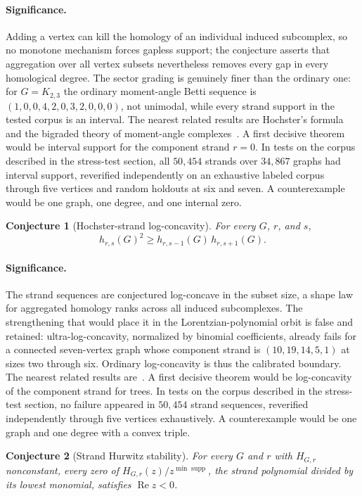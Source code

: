 \documentclass[11pt]{article}
\newtheorem{conjecture}{Conjecture}
\theoremstyle{definition}
\begin{document}
\paragraph{Significance.}
Adding a vertex can kill the homology of an individual induced subcomplex, so no monotone mechanism forces gapless support; the conjecture asserts that aggregation over all vertex subsets nevertheless removes every gap in every homological degree.  The sector grading is genuinely finer than the ordinary one: for $G=K_{2,3}$ the ordinary moment-angle Betti sequence is $(1,0,0,4,2,0,3,2,0,0,0)$, not unimodal, while every strand support in the tested corpus is an interval.  The nearest related results are Hochster's formula and the bigraded theory of moment-angle complexes~\cite{Hoch77,BP15}.  A first decisive theorem would be interval support for the component strand $r=0$.  In tests on the corpus described in the stress-test section, all $50{,}454$ strands over $34{,}867$ graphs had interval support, reverified independently on an exhaustive labeled corpus through five vertices and random holdouts at six and seven.  A counterexample would be one graph, one degree, and one internal zero.

\begin{conjecture}[Hochster-strand log-concavity]\label{x12}
For every $G$, $r$, and $s$,
\[
h_{r,s}(G)^2\ge h_{r,s-1}(G)\,h_{r,s+1}(G).
\]
\end{conjecture}

\paragraph{Significance.}
The strand sequences are conjectured log-concave in the subset size, a shape law for aggregated homology ranks across all induced subcomplexes.  The strengthening that would place it in the Lorentzian-polynomial orbit is false and retained: ultra-log-concavity, normalized by binomial coefficients, already fails for a connected seven-vertex graph whose component strand is $(10,19,14,5,1)$ at sizes two through six.  Ordinary log-concavity is thus the calibrated boundary.  The nearest related results are~\cite{Hoch77,BP15}.  A first decisive theorem would be log-concavity of the component strand for trees.  In tests on the corpus described in the stress-test section, no failure appeared in $50{,}454$ strand sequences, reverified independently through five vertices exhaustively.  A counterexample would be one graph and one degree with a convex triple.

\begin{conjecture}[Strand Hurwitz stability]\label{x13}
For every $G$ and $r$ with $H_{G,r}$ nonconstant, every zero of $H_{G,r}(z)/z^{\min\operatorname{supp}}$, the strand polynomial divided by its lowest monomial, satisfies $\operatorname{Re}z<0$.
\end{conjecture}
\end{document}
